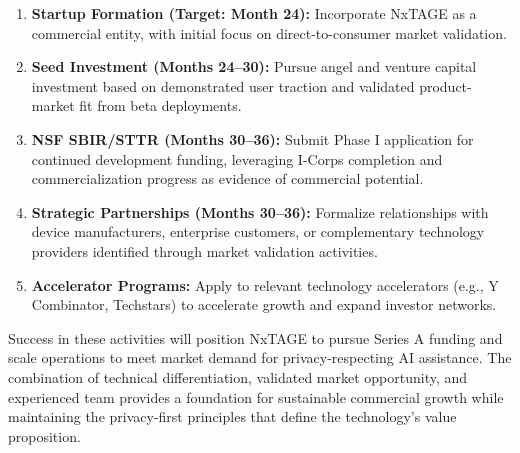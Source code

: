 \documentclass[11pt]{article}
\begin{document}
\begin{enumerate}[noitemsep]
    \item \textbf{Startup Formation (Target: Month 24):} Incorporate NxTAGE as a 
    commercial entity, with initial focus on direct-to-consumer market validation.
    
    \item \textbf{Seed Investment (Months 24--30):} Pursue angel and venture 
    capital investment based on demonstrated user traction and validated 
    product-market fit from beta deployments.
    
    \item \textbf{NSF SBIR/STTR (Months 30--36):} Submit Phase I application for 
    continued development funding, leveraging I-Corps completion and 
    commercialization progress as evidence of commercial potential.
    
    \item \textbf{Strategic Partnerships (Months 30--36):} Formalize relationships 
    with device manufacturers, enterprise customers, or complementary technology 
    providers identified through market validation activities.
    
    \item \textbf{Accelerator Programs:} Apply to relevant technology accelerators 
    (e.g., Y Combinator, Techstars) to accelerate growth and expand investor 
    networks.
\end{enumerate}

Success in these activities will position NxTAGE to pursue Series A funding and scale operations to meet market demand for privacy-respecting AI assistance. The combination of technical differentiation, validated market opportunity, and experienced team provides a foundation for sustainable commercial growth while maintaining the privacy-first principles that define the technology's value proposition.

\vspace*{-8pt}
\end{document}
